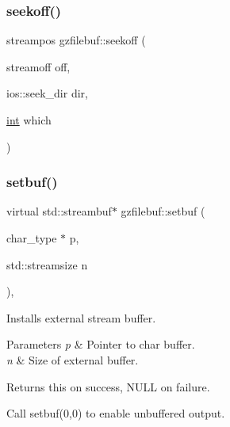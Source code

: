 \subsubsection{\texorpdfstring{seekoff()}{seekoff()}}
{\footnotesize\ttfamily streampos gzfilebuf\+::seekoff (\begin{DoxyParamCaption}\item[{streamoff}]{off,  }\item[{ios\+::seek\+\_\+dir}]{dir,  }\item[{\mbox{\hyperlink{ioapi_8h_a787fa3cf048117ba7123753c1e74fcd6}{int}}}]{which }\end{DoxyParamCaption})\hspace{0.3cm}{\ttfamily [virtual]}}

\mbox{\label{classgzfilebuf_a11ff58ab8f4de52cf496892b3a97827e}} 
\subsubsection{\texorpdfstring{setbuf()}{setbuf()}}
{\footnotesize\ttfamily virtual std\+::streambuf$\ast$ gzfilebuf\+::setbuf (\begin{DoxyParamCaption}\item[{char\+\_\+type $\ast$}]{p,  }\item[{std\+::streamsize}]{n }\end{DoxyParamCaption})\hspace{0.3cm}{\ttfamily [protected]}, {\ttfamily [virtual]}}



Installs external stream buffer. 


\begin{DoxyParams}{Parameters}
{\em p} & Pointer to char buffer. \\
\hline
{\em n} & Size of external buffer. \\
\hline
\end{DoxyParams}
\begin{DoxyReturn}{Returns}
{\ttfamily this} on success, N\+U\+LL on failure.
\end{DoxyReturn}
Call setbuf(0,0) to enable unbuffered output. \mbox{\label{classgzfilebuf_ad109ea4fc4ca7cc19d8014b53375255d}} 
